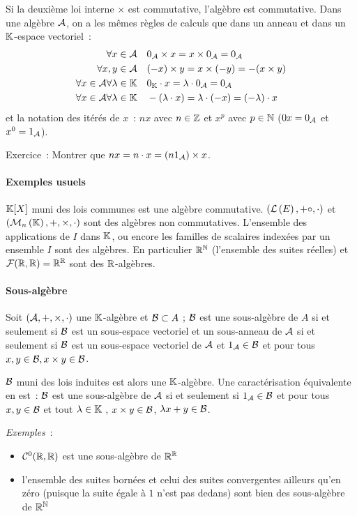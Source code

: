 Si la deuxième loi interne $\times$ est commutative, l'algèbre est commutative. Dans une algèbre $\mathcal{A}$, on a les mêmes règles de calculs que dans un anneau et dans un $\mathbb{K}$-espace vectoriel~:
\begin{align}
	\forall x \in \mathcal{A} &\quad 0_{\mathcal{A}} \times x = x \times 0_{\mathcal{A}} = 0_{\mathcal{A}} \\
	\forall x,y \in \mathcal{A} &\quad (-x) \times y = x \times (-y) = -(x\times y) \\
	\forall x \in \mathcal{A} \forall \lambda \in \mathbb{K} &\quad 0_{\mathbb{K}} \cdot x = \lambda \cdot 0_{\mathcal{A}} = 0_{\mathcal{A}} \\
	\forall x \in \mathcal{A} \forall \lambda \in \mathbb{K} &\quad -(\lambda \cdot x) = \lambda \cdot (-x) = (-\lambda)\cdot x
\end{align}
et la notation des itérés de $x$~: $nx$ avec $n \in \mathbb{Z}$ et $x^p$ avec $p \in \mathbb{N}$ ($0x=0_{\mathcal{A}}$ et $x^0=1_{\mathcal{A}}$).

Exercice~: Montrer que $nx = n \cdot x = (n1_{\mathcal{A}}) \times x$.

\paragraph{Exemples usuels}
$\mathbb{K}[X]$ muni des lois communes est une algèbre commutative. $(\mathcal{L}\left(E\right),+\circ,\cdot)$ et $(\mathcal{M}_{n}\left(\mathbb{K}\right), +, \times, \cdot)$ sont des algèbres non commutatives. L'ensemble des applications de $I$ dans $\mathbb{K}$, ou encore les familles de scalaires indexées par un ensemble $I$ sont des algèbres. En particulier $\mathbb{R}^{\mathbb{N}}$ (l'ensemble des suites réelles) et $\mathcal{F}(\mathbb{R},\mathbb{R}) = \mathbb{R}^{\mathbb{R}}$ sont des $\mathbb{R}$-algèbres.

\paragraph{Sous-algèbre}
\begin{defdef}
	Soit $(\mathcal{A},+,\times,\cdot)$ une $\mathbb{K}$-algèbre et $\mathcal{B} \subset A$ ;
	$\mathcal{B}$ est une sous-algèbre de $A$ si et seulement si $\mathcal{B}$ est un sous-espace vectoriel et un sous-anneau de $\mathcal{A}$ si et seulement si $\mathcal{B}$ est un sous-espace vectoriel de $\mathcal{A}$ et $1_{\mathcal{A}} \in \mathcal{B}$ et pour tous $x, y \in \mathcal{B}, x \times y \in \mathcal{B}$.
\end{defdef}

$\mathcal{B}$ muni des lois induites est alors une $\mathbb{K}$-algèbre. Une caractérisation équivalente en est~:
$\mathcal{B}$ est une sous-algèbre de $\mathcal{A}$  si et seulement si $1_{\mathcal{A}} \in \mathcal{B}$ et pour tous $x, y \in \mathcal{B}$ et tout $\lambda \in \mathbb{K}$ , $x \times y \in \mathcal{B}$, $\lambda x+y \in \mathcal{B}$.

\emph{Exemples}~:
\begin{itemize}
	\item $\mathcal{C}^{0}(\mathbb{R},\mathbb{R})$ est une sous-algèbre de $\mathbb{R}^{\mathbb{R}}$
	\item l'ensemble des suites bornées et celui des suites convergentes ailleurs qu'en zéro (puisque la suite égale à $1$ n'est pas dedans) sont bien des sous-algèbre de $\mathbb{R}^{\mathbb{N}}$
\end{itemize}
